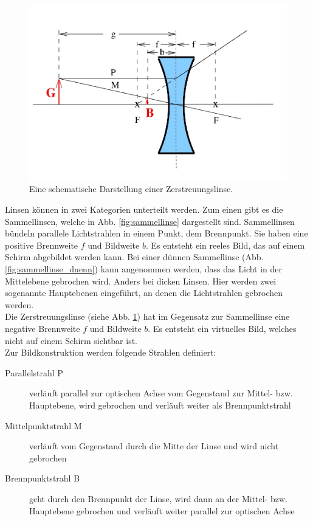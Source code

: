 \begin{figure}
    \centering
    \includegraphics[width=0.9\linewidth]{content/data/zerstreuungslinse.jpg}
    \caption{Eine schematische Darstellung einer Zerstreuungslinse. \cite[1]{anleitung}}
    \label{fig:zerstreuungslinse}
\end{figure}
Linsen können in zwei Kategorien unterteilt werden.
Zum einen gibt es die Sammellinsen, welche in Abb. \ref{fig:sammellinse} dargestellt sind.
Sammellinsen bündeln parallele Lichtstrahlen in einem Punkt, dem Brennpunkt.
Sie haben eine positive Brennweite $f$ und Bildweite $b$.
Es entsteht ein reeles Bild, das auf einem Schirm abgebildet werden kann.
Bei einer dünnen Sammellinse (Abb. \ref{fig:sammellinse_duenn}) kann angenommen werden, dass das Licht in der Mittelebene gebrochen wird.
Anders bei dicken Linsen.
Hier werden zwei sogenannte Hauptebenen eingeführt, an denen die Lichtstrahlen gebrochen werden.
\\
Die Zerstreuungslinse (siehe Abb. \ref{fig:zerstreuungslinse}) hat im Gegensatz zur Sammellinse eine negative Brennweite $f$ und Bildweite $b$.
Es entsteht ein virtuelles Bild, welches nicht auf einem Schirm sichtbar ist.
\\
Zur Bildkonstruktion werden folgende Strahlen definiert:
\begin{description}
    \item[Parallelstrahl P] verläuft parallel zur optischen Achse vom Gegenstand zur Mittel- bzw. Hauptebene, wird gebrochen und verläuft weiter als Brennpunktstrahl
    \item[Mittelpunktstrahl M] verläuft vom Gegenstand durch die Mitte der Linse und wird nicht gebrochen
    \item[Brennpunktstrahl B] geht durch den Brennpunkt der Linse, wird dann an der Mittel- bzw. Hauptebene gebrochen und verläuft weiter parallel zur optischen Achse
\end{description}

